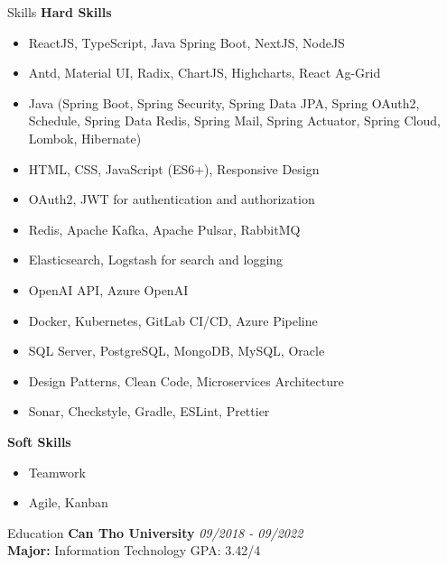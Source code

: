 \documentclass{resume} %
\begin{document}

\begin{rSection}{Skills}
{\bf Hard Skills}
\begin{itemize}
    \item ReactJS, TypeScript, Java Spring Boot, NextJS, NodeJS
    \item Antd, Material UI, Radix, ChartJS, Highcharts, React Ag-Grid
    \item Java (Spring Boot, Spring Security, Spring Data JPA, Spring OAuth2, Schedule, Spring Data Redis, Spring Mail, Spring Actuator, Spring Cloud, Lombok, Hibernate)
    \item HTML, CSS, JavaScript (ES6+), Responsive Design
    \item OAuth2, JWT for authentication and authorization
    \item Redis, Apache Kafka, Apache Pulsar, RabbitMQ
    \item Elasticsearch, Logstash for search and logging
    \item OpenAI API, Azure OpenAI
    \item Docker, Kubernetes, GitLab CI/CD, Azure Pipeline
    \item SQL Server, PostgreSQL, MongoDB, MySQL, Oracle
    \item Design Patterns, Clean Code, Microservices Architecture
    \item Sonar, Checkstyle, Gradle, ESLint, Prettier
\end{itemize}

{\bf Soft Skills}
\begin{itemize}
    \item Teamwork
    \item Agile, Kanban
\end{itemize}
\end{rSection}


\begin{rSection}{Education}
{\bf Can Tho University} \hfill {\em 09/2018 - 09/2022} 
\\ \textbf{Major:} Information Technology \hfill { GPA: 3.42/4 }
\end{rSection}
\end{document}
